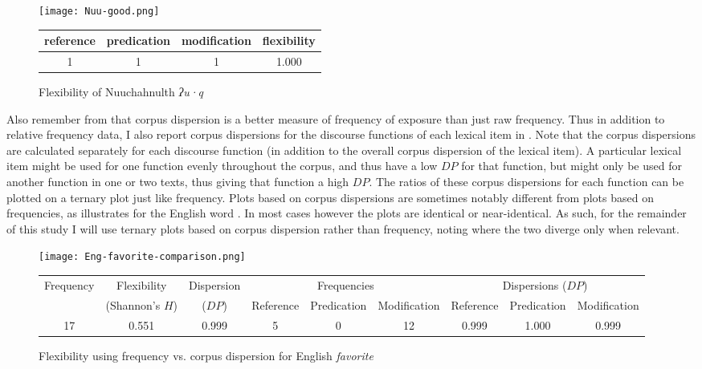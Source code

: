 \begin{figure}

  \centering
  \caption{Flexibility of Nuuchahnulth \textit{ʔu·q} }
  \label{fig:Nuu-good}

  \texttt{[image: Nuu-good.png]}

  \begin{tabular}{ c c c c }
    \toprule
    reference & predication & modification & flexibility\\
    \midrule
    1         & 1           & 1            & 1.000      \\
    \bottomrule
  \end{tabular}

\end{figure}

Also remember from  that corpus dispersion is a better measure of frequency of exposure than just raw frequency. Thus in addition to relative frequency data, I also report corpus dispersions for the discourse functions of each lexical item in . Note that the corpus dispersions are calculated separately for each discourse function (in addition to the overall corpus dispersion of the lexical item). A particular lexical item might be used for one function evenly throughout the corpus, and thus have a low $DP$ for that function, but might only be used for another function in one or two texts, thus giving that function a high $DP$. The ratios of these corpus dispersions for each function can be plotted on a ternary plot just like frequency. Plots based on corpus dispersions are sometimes notably different from plots based on frequencies, as  illustrates for the English word . In most cases however the plots are identical or near-identical. As such, for the remainder of this study I will use ternary plots based on corpus dispersion rather than frequency, noting where the two diverge only when relevant.

\begin{landscape}
\begin{figure}

  \centering
  \caption{Flexibility using frequency vs. corpus dispersion for English \textit{favorite}}
  \label{fig:plot-frequency-vs-dispersion}

  \texttt{[image: Eng-favorite-comparison.png]}

  \begin{tabular}{ c c c c c c c c c }
    \toprule
    Frequency & Flexibility     & Dispersion & \multicolumn{3}{c}{Frequencies}        & \multicolumn{3}{c}{Dispersions ($DP$)}\\
    { }       & (Shannon's $H$) & ($DP$)     & Reference & Predication & Modification & Reference & Predication & Modification\\
    \midrule
    17        & 0.551           & 0.999      & 5         & 0           & 12           & 0.999     & 1.000       & 0.999       \\
    \bottomrule
  \end{tabular}

\end{figure}
\end{landscape}

